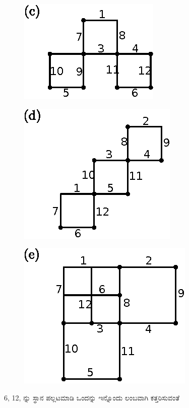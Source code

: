 \begin{enumerate}
\begin{minipage}[c]{4cm}
\begin{figure}[H]
\end{figure}
\end{minipage}
\begin{minipage}[c]{5cm}
\begin{figure}[H]
\centering
\includegraphics{images/chap7/ans12c.eps}

\end{figure}
\end{minipage}

\begin{figure}[H]
\centering
\includegraphics{images/chap7/ans12d.eps}
\end{figure}


\begin{minipage}[c]{4cm}
\begin{figure}[H]
\centering
\includegraphics{images/chap7/ans12e.eps}
\end{figure}
\end{minipage}
\qquad
\begin{minipage}[c]{5cm}
6, 12, ನ್ನು ಸ್ಥಾನ ಪಲ್ಲಟಮಾಡಿ ಒಂದನ್ನು ಇನ್ನೊಂದು ಲಂಬವಾಗಿ ಕತ್ತರಿಸುವಂತೆ 


\end{minipage}
\end{enumerate}
